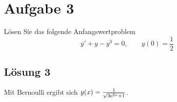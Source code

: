 \documentclass[main.tex]{subfiles}
\begin{document}
\section{Aufgabe 3}
Lösen Sie das folgende Anfangswertproblem
\[
    y' + y - y^3 = 0, \qquad y(0) = \frac{1}{2}
\]

\subsection{Lösung 3}
Mit Bernoulli ergibt sich $y(x) = \frac{1}{\sqrt{3\mathrm{e}^{2x} + 1}}$.
\end{document}
